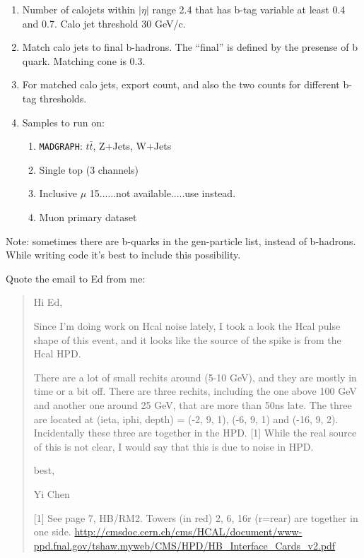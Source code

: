 \begin{enumerate}
\item Number of calojets within $|\eta|$ range 2.4 that has b-tag variable at least 0.4 and 0.7.  Calo jet threshold 30 GeV/c.
\item Match calo jets to final b-hadrons.  The ``final'' is defined by the presense of b quark.  Matching cone is 0.3.
\item For matched calo jets, export count, and also the two counts for different b-tag thresholds.
\item Samples to run on:
   \begin{enumerate}
   \item \texttt{MADGRAPH}: $t\bar{t}$, Z+Jets, W+Jets
   \item Single top (3 channels)
   \item Inclusive $\mu$ 15......not available.....use  instead.
   \item Muon primary dataset
   \end{enumerate}
\end{enumerate}

Note: sometimes there are b-quarks in the gen-particle list, instead of b-hadrons.  While writing code it's best to include this possibility.



Quote the email to Ed from me:

\begin{quote}
Hi Ed,

Since I'm doing work on Hcal noise lately, I took a look the Hcal pulse shape of this event, and it looks like the source of the spike is from the Hcal HPD.

There are a lot of small rechits around (5-10 GeV), and they are mostly in time or a bit off.  There are three rechits, including the one above 100 GeV and another one around 25 GeV, that are more than 50ns late.  The three are located at (ieta, iphi, depth) = (-2, 9, 1), (-6, 9, 1) and (-16, 9, 2).  Incidentally these three are together in the HPD. [1]  While the real source of this is not clear, I would say that this is due to noise in HPD.

best,

Yi Chen

[1] See page 7, HB/RM2.  Towers (in red) 2, 6, 16r (r=rear) are together in one side.  \url{http://cmsdoc.cern.ch/cms/HCAL/document/www-ppd.fnal.gov/tshaw.myweb/CMS/HPD/HB\_Interface\_Cards\_v2.pdf}
\end{quote}




